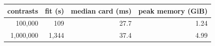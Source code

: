 \begin{tabular}{rrrr}
\toprule
contrasts & fit (s) & median card (ms) & peak memory (GiB) \\
\midrule
100,000 & 109 & 27.7 & 1.24 \\
1,000,000 & 1,344 & 37.4 & 4.99 \\
\bottomrule
\end{tabular}
